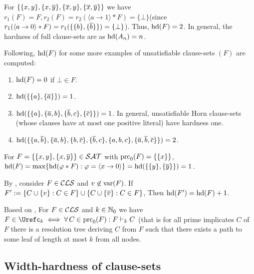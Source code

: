 \documentclass{report}
\begin{document}
\begin{examp}\label{exp:harducls}
For $\{ \{ x,y \},\{ x,\overline{y} \},\{ \overline{x},y \},\{ \overline{x},\overline{y} \} \}$ we have $r_1(F)=F, r_2(F)=r_2( \langle a \rightarrow 1 \rangle * F) = \{ \bot \}$(since $r_1( \langle a \rightarrow 0 \rangle * F)=r_1 (\{\{ b \}, \{ \overline b \}\}) = \{ \bot \}$). Thus, $\operatorname{hd}(F) = 2$. In general, the hardness of full clause-sets are as $\operatorname{hd}(A_n)=n$.
  
Following, $\operatorname{hd}(F)$ for some more examples of unsatisfiable clause-sets $(F)$ are computed:
  \begin{enumerate}
  \item $\operatorname{hd}(F) = 0$ if $\bot \in F$.
  \item $\operatorname{hd}(\{ \{ a \},\{ \overline{a} \} \}) = 1$.
  \item $\operatorname{hd}(\{ \{ a \},\{ \overline{a},b \}, \{ \overline{b},c \}, \{ \overline{c} \} \}) = 1$. In general, unsatisfiable Horn clause-sets (whose clauses have at most one positive literal) have hardness one.
  \item $\operatorname{hd}(\{ \{ a,\overline{b} \},\{ \overline{a},b \},\{ b,\overline{c} \},\{ \overline{b},c \},\{ a,b,c \},\{ \overline{a},\overline{b},\overline{c} \} \}) = 2$.
  \end{enumerate}
\end{examp}

\begin{examp}\label{exp:hd-extd}
For $F = \{ \{ x, y \} , \{ x,\overline y \} \} \in \mathcal{SAT}$ with $\operatorname{prc}_0(F) = \{ \{ x \} \}$,  $\operatorname{hd}(F)= \max \{  \operatorname{hd}(\varphi * F) : \varphi =\langle x \rightarrow 0 \rangle  \}=\operatorname{hd}(\{ \{ y \},\{ \overline y \} \})=1$.
\end{examp}
\begin{lem}\label{lem:hd1}
By  \cite{GwynneKullmann2012Slur}, consider $F \in \mathcal{CLS}$ and $v \not \in \operatorname{var}(F)$. If $F' := \{ C \cup \{ v \} : C \in F \} \cup \{ C \cup \{ \overline{v} \} : C \in F \}$, Then $\operatorname{hd}(F') = \operatorname{hd}(F) + 1$.
\end{lem}
\begin{lem}\label{lem:uck}
Based on \cite{GwynneKullmann2012Slur}, For $F \in \mathcal{CLS}$ and $k \in \mathbb{N}_0$ we have $F \in \Urefc_k \iff \fa\, C \in \primec_0(F) : F \vdash_k C$ (that is for all prime implicates $C$ of $F$ there is a resolution tree deriving $C$ from $F$ such that there exists a path to some leaf of length at most $k$ from all nodes.
\end{lem}
\subsection{Width-hardness of clause-sets}
\label{sec:whdd}
\end{document}
